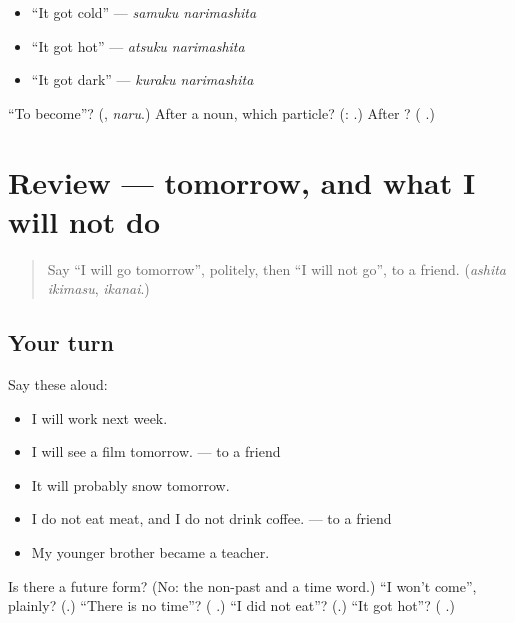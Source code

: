 \begin{itemize}
\raggedright
  \item \textquotedblleft{}It got cold\textquotedblright{} — \emph{samuku narimashita}
  \item \textquotedblleft{}It got hot\textquotedblright{} — \emph{atsuku narimashita}
  \item \textquotedblleft{}It got dark\textquotedblright{} — \emph{kuraku narimashita}
\end{itemize}

\begin{tcolorbox}[breakable,colback=teal!4,colframe=teal!35!black,title={Before you move on}]
\textquotedblleft{}To become\textquotedblright{}? (\textbf{}, \emph{naru}.) After a noun, which particle? (\textbf{}: \textbf{ }.) After \textbf{}? (\textbf{ }.)
\end{tcolorbox}
\section[(review)]{Review — tomorrow, and what I will not do}

\label{lesson:JA-R251-tomorrow-and-not}



\begin{quote}
Say \textquotedblleft{}I will go tomorrow\textquotedblright{}, politely, then \textquotedblleft{}I will not go\textquotedblright{}, to a friend. (\emph{ashita ikimasu}, \emph{ikanai}.)
\end{quote}

\subsection*{Your turn}
Say these aloud:

\begin{itemize}
\raggedright
  \item I will work next week.
  \item I will see a film tomorrow. — to a friend
  \item It will probably snow tomorrow.
  \item I do not eat meat, and I do not drink coffee. — to a friend
  \item My younger brother became a teacher.
\end{itemize}

\begin{tcolorbox}[breakable,colback=teal!4,colframe=teal!35!black,title={Before you move on}]
Is there a future form? (No: the non-past and a time word.) \textquotedblleft{}I won't come\textquotedblright{}, plainly? (\textbf{}.) \textquotedblleft{}There is no time\textquotedblright{}? (\textbf{ }.) \textquotedblleft{}I did not eat\textquotedblright{}? (\textbf{}.) \textquotedblleft{}It got hot\textquotedblright{}? (\textbf{ }.)
\end{tcolorbox}
